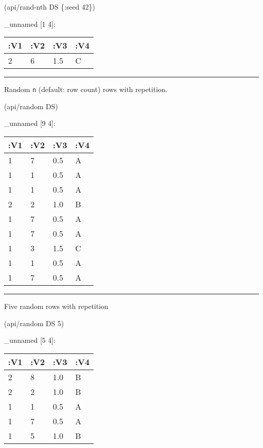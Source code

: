 \documentclass[]{article}
\newenvironment{Shaded}{\begin{snugshade}}{\end{snugshade}}
\newcommand{\AttributeTok}[1]{\textcolor[rgb]{0.77,0.63,0.00}{#1}}
\newcommand{\DecValTok}[1]{\textcolor[rgb]{0.00,0.00,0.81}{#1}}
\newcommand{\NormalTok}[1]{#1}
\begin{document}
\begin{Shaded}
\begin{Highlighting}[]
\NormalTok{(api/rand-nth DS \{}\AttributeTok{:seed} \DecValTok{42}\NormalTok{\})}
\end{Highlighting}
\end{Shaded}

\_unnamed {[}1 4{]}:

\begin{longtable}[]{@{}llll@{}}
\toprule
:V1 & :V2 & :V3 & :V4\tabularnewline
\midrule
\endhead
2 & 6 & 1.5 & C\tabularnewline
\bottomrule
\end{longtable}

\begin{center}\rule{0.5\linewidth}{0.5pt}\end{center}

Random \texttt{n} (default: row count) rows with repetition.

\begin{Shaded}
\begin{Highlighting}[]
\NormalTok{(api/random DS)}
\end{Highlighting}
\end{Shaded}

\_unnamed {[}9 4{]}:

\begin{longtable}[]{@{}llll@{}}
\toprule
:V1 & :V2 & :V3 & :V4\tabularnewline
\midrule
\endhead
1 & 7 & 0.5 & A\tabularnewline
1 & 1 & 0.5 & A\tabularnewline
1 & 1 & 0.5 & A\tabularnewline
2 & 2 & 1.0 & B\tabularnewline
1 & 7 & 0.5 & A\tabularnewline
1 & 7 & 0.5 & A\tabularnewline
1 & 3 & 1.5 & C\tabularnewline
1 & 1 & 0.5 & A\tabularnewline
1 & 7 & 0.5 & A\tabularnewline
\bottomrule
\end{longtable}

\begin{center}\rule{0.5\linewidth}{0.5pt}\end{center}

Five random rows with repetition

\begin{Shaded}
\begin{Highlighting}[]
\NormalTok{(api/random DS }\DecValTok{5}\NormalTok{)}
\end{Highlighting}
\end{Shaded}

\_unnamed {[}5 4{]}:

\begin{longtable}[]{@{}llll@{}}
\toprule
:V1 & :V2 & :V3 & :V4\tabularnewline
\midrule
\endhead
2 & 8 & 1.0 & B\tabularnewline
2 & 2 & 1.0 & B\tabularnewline
1 & 1 & 0.5 & A\tabularnewline
1 & 7 & 0.5 & A\tabularnewline
1 & 5 & 1.0 & B\tabularnewline
\bottomrule
\end{longtable}
\end{document}
